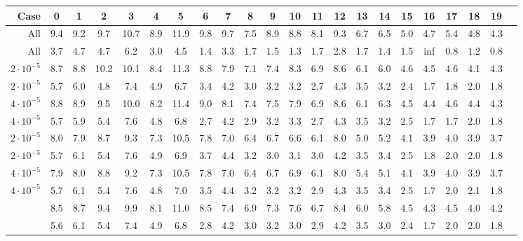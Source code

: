\begin{table}
	\begin{tabular}{|r||c|c|c|c|c|c|c|c|c|c|c|c|c|c|c|c|c|c|c|c|c|}
		\hline
	Case& 0 & 1 & 2 & 3 & 4 & 5 & 6 & 7 & 8 & 9 & 10 & 11 & 12 & 13 & 14 & 15 & 16 & 17 & 18 & 19 \\\hline\hline
All & 9.4 &9.2 &9.7 &10.7 &8.9 &11.9 &9.8 &9.7 &7.5 &8.9 &8.8 &8.1 &9.3 &6.7 &6.5 &5.0 &4.7 &5.4 &4.8 &4.3  \\\hline
All & 3.7 &4.7 &4.7 &6.2 &3.0 &4.5 &1.4 &3.3 &1.7 &1.5 &1.3 &1.7 &2.8 &1.7 &1.4 &1.5 &inf &0.8 &1.2 &0.8  \\\hline\hline

$2\cdot10^{-5}$&8.7 &8.8 &10.2 &10.1 &8.4 &11.3 &8.8 &7.9 &7.1 &7.4 &8.3 &6.9 &8.6 &6.1 &6.0 &4.6 &4.5 &4.6 &4.1 &4.3  \\\hline
$2\cdot10^{-5}$&5.7 &6.0 &4.8 &7.4 &4.9 &6.7 &3.4 &4.2 &3.0 &3.2 &3.2 &2.7 &4.3 &3.5 &3.2 &2.4 &1.7 &1.8 &2.0 &1.8  \\\hline\hline

$4\cdot10^{-5}$&8.8 &8.9 &9.5 &10.0 &8.2 &11.4 &9.0 &8.1 &7.4 &7.5 &7.9 &6.9 &8.6 &6.1 &6.3 &4.5 &4.4 &4.6 &4.4 &4.3  \\\hline
$4\cdot10^{-5}$&5.7 &5.9 &5.4 &7.6 &4.8 &6.8 &2.7 &4.2 &2.9 &3.2 &3.3 &2.7 &4.3 &3.5 &3.2 &2.5 &1.7 &1.7 &2.0 &1.8  \\\hline\hline

$2\cdot10^{-5}$&8.0 &7.9 &8.7 &9.3 &7.3 &10.5 &7.8 &7.0 &6.4 &6.7 &6.6 &6.1 &8.0 &5.0 &5.2 &4.1 &3.9 &4.0 &3.9 &3.7  \\\hline
$2\cdot10^{-5}$&5.7 &6.1 &5.4 &7.6 &4.9 &6.9 &3.7 &4.4 &3.2 &3.0 &3.1 &3.0 &4.2 &3.5 &3.4 &2.5 &1.8 &2.0 &2.0 &1.8  \\\hline\hline

$4\cdot10^{-5}$&7.9 &8.0 &8.8 &9.2 &7.3 &10.5 &7.8 &7.0 &6.4 &6.7 &6.9 &6.1 &8.0 &5.4 &5.1 &4.1 &3.9 &4.0 &3.9 &3.7  \\\hline
$4\cdot10^{-5}$&5.7 &6.1 &5.4 &7.6 &4.8 &7.0 &3.5 &4.4 &3.2 &3.2 &3.2 &2.9 &4.3 &3.5 &3.4 &2.5 &1.7 &2.0 &2.1 &1.8  \\\hline

&8.5 &8.7 &9.4 &9.9 &8.1 &11.0 &8.5 &7.4 &6.9 &7.3 &7.6 &6.7 &8.4 &6.0 &5.8 &4.5 &4.3 &4.5 &4.0 &4.2  \\\hline
&5.6 &6.1 &5.4 &7.4 &4.9 &6.8 &2.8 &4.2 &3.0 &3.2 &3.0 &2.9 &4.2 &3.5 &3.0 &2.4 &1.7 &2.0 &2.0 &1.8  \\\hline
	\end{tabular}
	
	

	
\end{table}